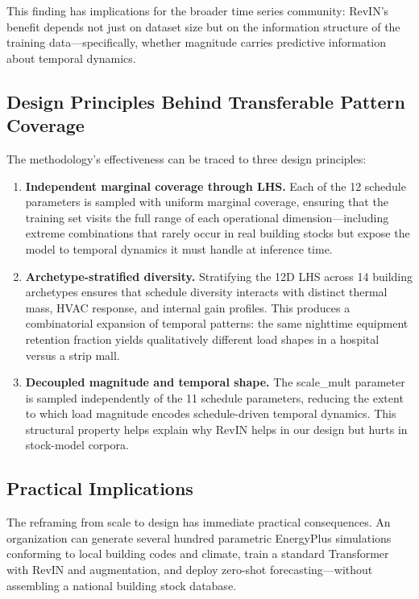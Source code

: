 \documentclass[preprint,12pt,authoryear]{elsarticle}
\begin{document}
This finding has implications for the broader time series community: RevIN's benefit depends not just on dataset size but on the information structure of the training data---specifically, whether magnitude carries predictive information about temporal dynamics.

\subsection{Design Principles Behind Transferable Pattern Coverage}

The methodology's effectiveness can be traced to three design principles:

\begin{enumerate}
\item \textbf{Independent marginal coverage through LHS.} Each of the 12 schedule parameters is sampled with uniform marginal coverage, ensuring that the training set visits the full range of each operational dimension---including extreme combinations that rarely occur in real building stocks but expose the model to temporal dynamics it must handle at inference time.

\item \textbf{Archetype-stratified diversity.} Stratifying the 12D LHS across 14 building archetypes ensures that schedule diversity interacts with distinct thermal mass, HVAC response, and internal gain profiles. This produces a combinatorial expansion of temporal patterns: the same nighttime equipment retention fraction yields qualitatively different load shapes in a hospital versus a strip mall.

\item \textbf{Decoupled magnitude and temporal shape.} The scale\_mult parameter is sampled independently of the 11 schedule parameters, reducing the extent to which load magnitude encodes schedule-driven temporal dynamics. This structural property helps explain why RevIN helps in our design but hurts in stock-model corpora.
\end{enumerate}

\subsection{Practical Implications}

The reframing from scale to design has immediate practical consequences. An organization can generate several hundred parametric EnergyPlus simulations conforming to local building codes and climate, train a standard Transformer with RevIN and augmentation, and deploy zero-shot forecasting---without assembling a national building stock database.
\end{document}
